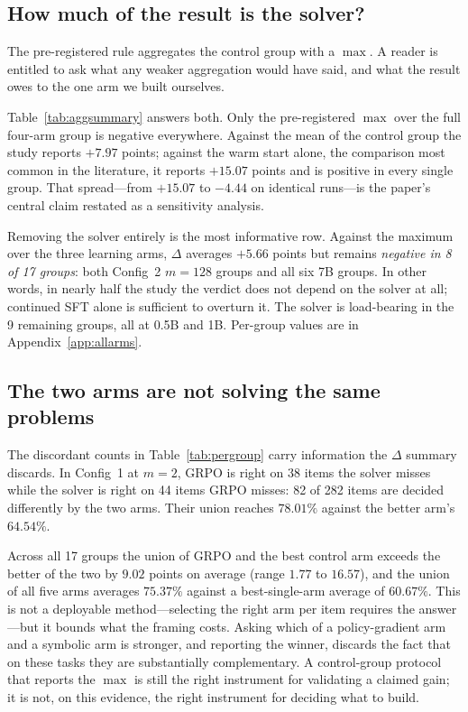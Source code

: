\subsection{How much of the result is the solver?}

The pre-registered rule aggregates the control group with a $\max$. A reader is
entitled to ask what any weaker aggregation would have said, and what the
result owes to the one arm we built ourselves.



Table~\ref{tab:aggsummary} answers both. Only the pre-registered $\max$ over
the full four-arm group is negative everywhere. Against the mean of the control
group the study reports $+7.97$ points; against the warm start alone, the
comparison most common in the literature, it reports $+15.07$ points and is
positive in every single group. That spread---from $+15.07$ to $-4.44$ on
identical runs---is the paper's central claim restated as a sensitivity
analysis.

Removing the solver entirely is the most informative row. Against the maximum
over the three learning arms, $\Delta$ averages $+5.66$ points but remains
\emph{negative in 8 of 17 groups}: both Config~2 $m{=}128$ groups and all six
7B groups. In other words, in nearly half the study the verdict does not depend
on the solver at all; continued SFT alone is sufficient to overturn it. The
solver is load-bearing in the 9 remaining groups, all at 0.5B and 1B.
Per-group values are in Appendix~\ref{app:allarms}.

\subsection{The two arms are not solving the same problems}

The discordant counts in Table~\ref{tab:pergroup} carry information the
$\Delta$ summary discards. In Config~1 at $m{=}2$, GRPO is right on 38 items
the solver misses while the solver is right on 44 items GRPO misses: 82 of 282
items are decided differently by the two arms. Their union reaches $78.01\%$
against the better arm's $64.54\%$.

Across all 17 groups the union of GRPO and the best control arm exceeds the
better of the two by $9.02$ points on average (range $1.77$ to $16.57$), and
the union of all five arms averages $75.37\%$ against a best-single-arm average
of $60.67\%$. This is not a deployable method---selecting the right arm per
item requires the answer---but it bounds what the framing costs. Asking which
of a policy-gradient arm and a symbolic arm is stronger, and reporting the
winner, discards the fact that on these tasks they are substantially
complementary. A control-group protocol that reports the $\max$ is still the
right instrument for validating a claimed gain; it is not, on this evidence,
the right instrument for deciding what to build.
